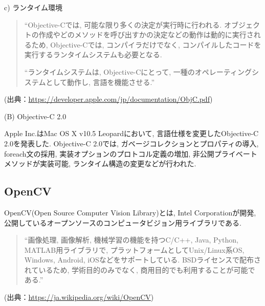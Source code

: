 \begin{description}
\begin{description}
\newpage

\item c) ランタイム環境

\begin{quotation}
\begin{screen}
“Objective-Cでは, 可能な限り多くの決定が実行時に行われる.
オブジェクトの作成やどのメソッドを呼び出すかの決定などの動作は動的に実行されるため, Objective-Cでは, コンパイラだけでなく, コンパイルしたコードを実行するランタイムシステムも必要となる.

“ランタイムシステムは, Objective-Cにとって, 一種のオペレーティングシステムとして動作し, 言語を機能させる.”
\end{screen}
\end{quotation}
\begin{flushright}
(出典：\url{https://developer.apple.com/jp/documentation/ObjC.pdf})
\end{flushright}

\end{description}

\item (B) Objective-C 2.0

Apple Inc.はMac OS X v10.5 Leopardにおいて, 言語仕様を変更したObjective-C 2.0を発表した.
Objective-C 2.0では, ガベージコレクションとプロパティの導入, foreach文の採用, 実装オプションのプロトコル定義の増加, 非公開プライベートメソッドが実装可能, ランタイム構造の変更などが行われた.
\end{description}

\subsection{OpenCV}
OpenCV(Open Source Computer Vision Library)とは, Intel Corporationが開発, 公開しているオープンソースのコンピュータビジョン用ライブラリである.

\begin{quotation}
\begin{screen}
“画像処理, 画像解析, 機械学習の機能を持つC/C++, Java, Python, MATLAB用ライブラリで, プラットフォームとしてUnix/Linux系OS, Windows, Android, iOSなどをサポートしている.
BSDライセンスで配布されているため, 学術目的のみでなく, 商用目的でも利用することが可能である.”
\end{screen}
\end{quotation}
\begin{flushright}
(出典：\url{https://ja.wikipedia.org/wiki/OpenCV})
\end{flushright}

